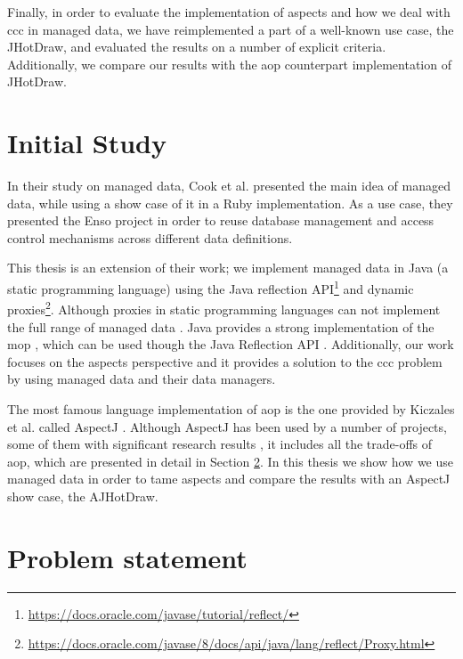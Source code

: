 Finally, in order to evaluate the implementation of aspects and how we deal with \ac{ccc} in managed data, we have reimplemented a part of a well-known use case, the JHotDraw, and evaluated the results on a number of explicit criteria.
Additionally, we compare our results with the \ac{aop} counterpart implementation of JHotDraw.

\section{Initial Study}\label{Initial Study}
In their study on managed data, Cook et al. \cite{loh2012managed} presented the main idea of managed data, while using a show case of it in a Ruby implementation. 
As a use case, they presented the Enso project in order to reuse database management and  access control mechanisms across different data definitions.

This thesis is an extension of their work; we implement managed data in Java (a static programming language) using the Java reflection API\footnote{\url{https://docs.oracle.com/javase/tutorial/reflect/}} and dynamic proxies\footnote{\url{https://docs.oracle.com/javase/8/docs/api/java/lang/reflect/Proxy.html}}. 
Although proxies in static programming languages can not implement the full range of managed data \cite{loh2012managed}. 
Java provides a strong implementation of the \ac{mop} \cite{kiczales1991art}, which can be used though the Java Reflection API \cite{forman2004java}. 
Additionally, our work focuses on the aspects perspective and it provides a solution to the \ac{ccc} problem by using managed data and their data managers.

The most famous language implementation of \ac{aop} is the one provided by Kiczales et al. called AspectJ \cite{kiczales2001overview}. 
Although AspectJ has been used by a number of projects, some of them with significant research results \cite{hannemann2002design} \cite{marinajhotdraw}, it includes all the trade-offs of \ac{aop}, which are presented in detail in Section \ref{Problem statement}.
In this thesis we show how we use managed data in order to tame aspects and compare the results with an AspectJ show case, the AJHotDraw.

\section{Problem statement}\label{Problem statement}

